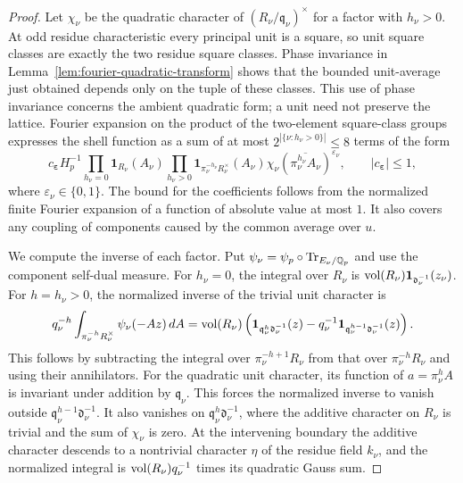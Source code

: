 \begin{proof}
Let $\chi_\nu$ be the quadratic character of
$(R_\nu/\mathfrak q_\nu)^\times$ for a factor with $h_\nu>0$.  At odd
residue characteristic every principal unit is a square, so unit square
classes are exactly the two residue square classes.  Phase invariance in
Lemma~\ref{lem:fourier-quadratic-transform} shows that the bounded unit-average
just obtained depends only on the tuple of these classes.  This use of phase
invariance concerns the ambient quadratic form; a unit need not preserve
the lattice.  Fourier expansion on the product of the two-element
square-class groups expresses the shell function as a sum of at most
$2^{|\{\nu:h_\nu>0\}|}\le8$ terms of the form
\[
 c_{\boldsymbol\varepsilon}H_p^{-1}
 \prod_{h_\nu=0}\mathbf1_{R_\nu}(A_\nu)
 \prod_{h_\nu>0}
   \mathbf1_{\pi_\nu^{-h_\nu}R_\nu^\times}(A_\nu)
   \chi_\nu(\overline{\pi_\nu^{h_\nu}A_\nu})^{\varepsilon_\nu},
 \qquad |c_{\boldsymbol\varepsilon}|\le1,
\]
where $\varepsilon_\nu\in\{0,1\}$.  The bound for the coefficients follows
from the normalized finite Fourier expansion of a function of absolute
value at most $1$.  It also covers any coupling of components caused by
the common average over $u$.

We compute the inverse of each factor.  Put
$\psi_\nu=\psi_p\circ\operatorname{Tr}_{E_\nu/\mathbb Q_p}$ and use the component self-dual
measure.  For $h_\nu=0$, the integral over $R_\nu$ is
$\operatorname{vol}(R_\nu)\mathbf1_{\mathfrak d_\nu^{-1}}(z_\nu)$.
For $h=h_\nu>0$, the normalized inverse of the trivial unit character is
\[
 q_\nu^{-h}\int_{\pi_\nu^{-h}R_\nu^\times}
       \psi_\nu(-Az)\,dA
 =\operatorname{vol}(R_\nu)\left(
    \mathbf1_{\mathfrak q_\nu^h\mathfrak d_\nu^{-1}}(z)
   -q_\nu^{-1}\mathbf1_{\mathfrak q_\nu^{h-1}\mathfrak d_\nu^{-1}}(z)
                     \right).
\]
This follows by subtracting the integral over $\pi_\nu^{-h+1}R_\nu$ from
that over $\pi_\nu^{-h}R_\nu$ and using their annihilators.  For the quadratic
unit character, its function of $a=\pi_\nu^hA$ is invariant under addition
by $\mathfrak q_\nu$.  This forces the normalized inverse to vanish outside
$\mathfrak q_\nu^{h-1}\mathfrak d_\nu^{-1}$.  It also vanishes on
$\mathfrak q_\nu^h\mathfrak d_\nu^{-1}$, where the additive character on
$R_\nu$ is trivial and the sum of $\chi_\nu$ is zero.  At the intervening
boundary the additive character descends to a nontrivial character $\eta$
of the residue field $k_\nu$, and the normalized integral is
$\operatorname{vol}(R_\nu)q_\nu^{-1}$ times its quadratic Gauss sum.


\end{proof}
